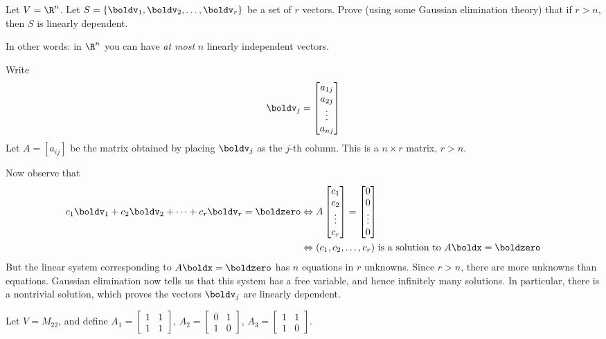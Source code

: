 \bb
\ii Let $V=\R^n$. Let $S=\{\boldv_1,\boldv_2,\dots ,\boldv_r\}$ be a set of $r$ vectors. Prove (using some Gaussian elimination theory) that if $r>n$, then $S$ is linearly dependent. 

In other words: in $\R^n$ you can have {\em at most} $n$ linearly independent vectors.  
\\
\begin{solution}
\noindent Write 
\[
\boldv_j=\begin{bmatrix}a_{1j} \\a_{2j} \\ \vdots \\ a_{nj}
\end{bmatrix}
\]
Let $A=[a_{ij}]$ be the matrix obtained by placing $\boldv_j$ as the $j$-th column. This is a $n\times r$ matrix, $r>n$. 

Now observe that 
\begin{align*}
c_1\boldv_1+c_2\boldv_2+\cdots +c_r\boldv_r=\boldzero
&\Leftrightarrow A\begin{bmatrix}
c_1\\c_2 \\ \vdots \\ c_r \end{bmatrix}
=\begin{bmatrix}0\\ 0 \\ \vdots \\ 0  \end{bmatrix}\\
&\Leftrightarrow (c_1,c_2,\dots, c_r) \text{ is a solution to } A\boldx=\boldzero
\end{align*}
But the linear system corresponding to $A\boldx=\boldzero$ has $n$ equations in $r$ unknowns. Since $r>n$, there are more unknowns than equations. Gaussian elimination now tells us that this system has a free variable, and hence infinitely many solutions. In particular, there is a nontrivial solution, which proves the vectors $\boldv_j$ are linearly dependent. 
\end{solution}
\ii Let $V=M_{22}$, and define $A_1=\begin{bmatrix}
1&1\\1&1
\end{bmatrix}$, $A_2=\begin{bmatrix}
0&1\\1&0
\end{bmatrix}$, $A_3=\begin{bmatrix}
1&1\\ 1&0
\end{bmatrix}$. 
